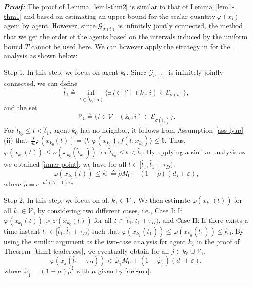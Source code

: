 \documentclass[a4paper, 11pt]{article}
\def \defn{\triangleq}
\newenvironment{IEEEproof}[1][\bf Proof]{\smallskip\par\noindent\textit{#1: }}{\hspace*{\fill} \rule{6pt}{6pt}\smallskip}
\newcommand{\eps}{\varepsilon}
\begin{document}
\begin{IEEEproof}
The proof of Lemma~\ref{lem1-thm2} is similar to that of Lemma~\ref{lem1-thm1} and based on estimating
an upper bound for the scalar quantity $\varphi(x_i)$ agent by agent.
However, since $\mathcal{G}_{\sigma(t)}$ is infinitely jointly connected,
the method that we get the order of the agents based on the intervals induced by the uniform bound $T$ cannot be used here.
We can however apply the strategy in \cite{shi-johansson-hong} for the analysis as shown below: 

\noindent Step 1. In this step, we focus on agent $k_0$. Since $\mathcal{G}_{\sigma(t)}$ is infinitely jointly connected,
we can define
\begin{equation*}\label{IJC-def-t1}
\hat{t}_1 \defn \inf_{t \in [\tilde{t}_{k_0},\infty)} \{\exists \, i \in \mathcal{V} \mid (k_0,i) \in \mathcal{E}_{\sigma(t)}\},
\end{equation*}
and the set
\begin{equation*}\label{IJC-def-V1}
\mathcal{V}_1 \defn \{ i \in \mathcal{V} \mid (k_0,i) \in \mathcal{E}_{\sigma(\hat{t}_1)}\}.
\end{equation*}
For $\tilde{t}_{k_0} \leq t < \hat{t}_1$, agent $k_0$ has no neighbor, it follows from Assumption~\ref{ass-lyap}(ii) that
$\frac{d}{dt}\varphi(x_{k_0}(t)) =\langle \nabla \varphi(x_{k_0}), f(t,x_{k_0})\rangle \leq 0$.
Thus, $\varphi(x_{k_0}(t)) \leq \varphi(x_{k_0}(\tilde{t}_{k_0}))$ for $\tilde{t}_{k_0} \leq t < \hat{t}_1$.
By applying a similar analysis as we obtained \eqref{inner-point}, we have for all $t \in [\hat{t}_1,\hat{t}_1+\tau_D)$,
\begin{equation*}\label{inner-point-undirected}
\varphi(x_{k_0}(t)) \leq \hat{\kappa}_0 \defn \hat{\rho} M_0+(1-\hat{\rho})(d_\star+\eps),
\end{equation*}
where $\hat{\rho}=e^{-a^* (N-1)\tau_D}$.

\vspace{2mm}

\noindent Step 2. In this step, we focus on all $k_1 \in \mathcal{V}_1$.
We then estimate $\varphi(x_{k_1}(t))$ for all $k_1 \in \mathcal{V}_1$ by considering two different cases, i.e.,
Case I: If $\varphi(x_{k_1}(t))>\varphi(x_{k_0}(t))$ for all $t \in [\hat{t}_1,\hat{t}_1+\tau_D)$, and
Case II: If there exists a time instant $\bar{t}_1 \in [\hat{t}_1,\hat{t}_1+\tau_D)$ such that
$\varphi(x_{k_1}(\bar{t}_1)) \leq \varphi(x_{k_0}(\bar{t}_1))\leq \hat{\kappa}_0$.
By using the similar argument as the two-case analysis for agent $k_1$ in the proof of Theorem~\ref{thm1-leaderless},
we eventually obtain for all $j \in k_0 \cup \mathcal{V}_1$,
\begin{equation}\label{inner-point-3-undirected}
\varphi(x_j(\hat{t}_1+\tau_D))  < \hat{\varphi}_1M_0+(1-\hat{\varphi}_1)(d_\star+\eps),
\end{equation}
where $\hat{\varphi}_1=(1-\mu){\hat{\rho}}^2$ with $\mu$ given by \eqref{def-mu}.


\end{IEEEproof}
\end{document}
